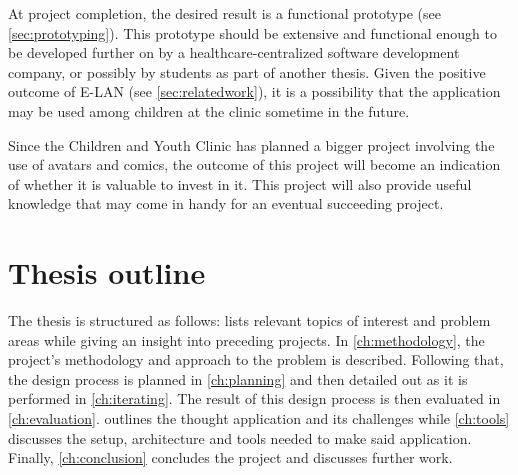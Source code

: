 At project completion, the desired result is a functional prototype (see \autoref{sec:prototyping}). This prototype should be extensive and functional enough to be developed further on by a healthcare-centralized software development company, or possibly by students as part of another thesis. Given the positive outcome of E-LAN (see \autoref{sec:relatedwork}), it is a possibility that the application may be used among children at the clinic sometime in the future.


Since the Children and Youth Clinic has planned a bigger project involving the use of avatars and comics, the outcome of this project will become an indication of whether it is valuable to invest in it. This project will also provide useful knowledge that may come in handy for an eventual succeeding project.

\section{Thesis outline}
\label{sec:outline}

The thesis is structured as follows:  lists relevant topics of interest and problem areas while giving an insight into preceding projects. In \autoref{ch:methodology}, the project's methodology and approach to the problem is described. Following that, the design process is planned in \autoref{ch:planning} and then detailed out as it is performed in \autoref{ch:iterating}. The result of this design process is then evaluated in \autoref{ch:evaluation}.  outlines the thought application and its challenges while \autoref{ch:tools} discusses the setup, architecture and tools needed to make said application. Finally, \autoref{ch:conclusion} concludes the project and discusses further work.

